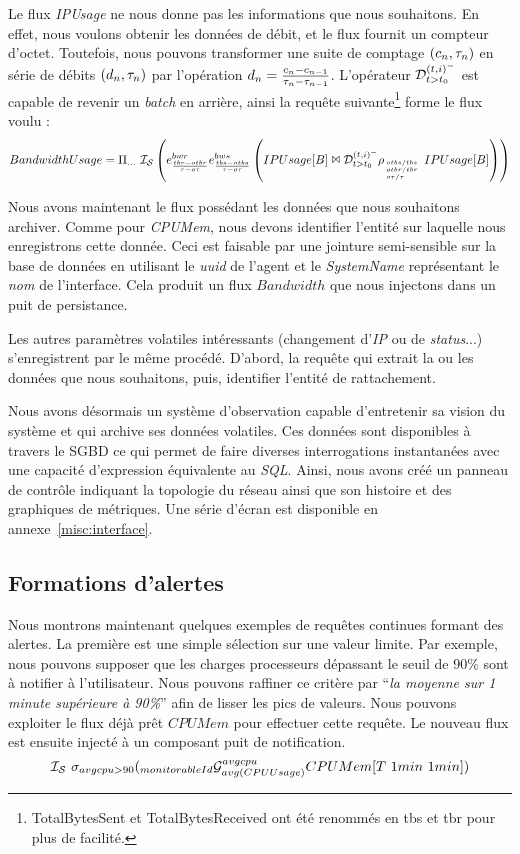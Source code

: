 Le flux \textit{IPUsage} ne nous donne pas les informations que nous souhaitons. En effet, nous voulons obtenir les données de débit, et le flux fournit un compteur d'octet. Toutefois, nous pouvons transformer une suite de comptage $(c_n,\tau_n)$ en série de débits $(d_n,\tau_n)$ par l'opération $d_n=\frac{c_n-c_{n-1}}{\tau_n-\tau_{n-1}}$. L'opérateur $\mathcal{D}_{t>t_0}^{(t,i)^-}$ est capable de revenir un \textit{batch} en arrière, ainsi la requête suivante\footnote{TotalBytesSent et TotalBytesReceived ont été renommés en tbs et tbr pour plus de facilité.} forme le flux voulu :
$$BandwidthUsage = \Pi_{...}\ \mathcal{I_S} \left( e_{\frac{tbr-otbr}{\tau-o\tau}}^{bwr} e_{\frac{tbs-otbs}{\tau-o\tau}}^{bws}\left(IPUsage[B] \Join \mathcal{D}_{t>t_0}^{(t,i)^-} \rho_{\hspace{-0.33em}\tiny\begin{array}{l} otbs/tbs\\otbr/tbr\\ o\tau/\tau\end{array}}IPUsage[B]\right)\right)$$

Nous avons maintenant le flux possédant les données que nous souhaitons archiver. Comme pour \textit{CPUMem}, nous devons identifier l'entité sur laquelle nous enregistrons cette donnée. Ceci est faisable par une jointure semi-sensible sur la base de données en utilisant le \textit{uuid} de l'agent et le \textit{SystemName} représentant le \textit{nom} de l'interface. Cela produit un flux $Bandwidth$ que nous injectons dans un puit de persistance.

Les autres paramètres volatiles intéressants (changement d'\textit{IP} ou de \textit{status}...) s'enregistrent par le même procédé. D'abord, la requête qui extrait la ou les données que nous souhaitons, puis, identifier l'entité de rattachement.

Nous avons désormais un système d'observation capable d'entretenir sa vision du système et qui archive ses données volatiles. Ces données sont disponibles à travers le SGBD ce qui permet de faire diverses interrogations instantanées avec une capacité d'expression équivalente au \textit{SQL}. Ainsi, nous avons créé un panneau de contrôle indiquant la topologie du réseau ainsi que son histoire et des graphiques de métriques. Une série d'écran est disponible en annexe~\ref{misc:interface}.

\subsection{Formations d'alertes}
Nous montrons maintenant quelques exemples de requêtes continues formant des alertes. La première est une simple sélection sur une valeur limite. Par exemple, nous pouvons supposer que les charges processeurs dépassant le seuil de 90\% sont à notifier à l'utilisateur. Nous pouvons raffiner ce critère par \enquote{\it la moyenne sur 1 minute supérieure à 90\%} afin de lisser les pics de valeurs. Nous pouvons exploiter le flux déjà prêt $CPUMem$ pour effectuer cette requête. Le nouveau flux est ensuite injecté à un composant puit de notification.
$$\IS\ \sigma_{avgcpu>90}(\null_{monitorableId}\G_{avg(CPUUsage)}^{avgcpu} CPUMem[T\ 1min\ 1min])$$

